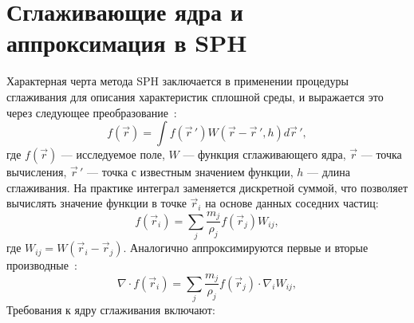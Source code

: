 \section{Сглаживающие ядра и аппроксимация в SPH}

Характерная черта метода SPH заключается в применении процедуры сглаживания для описания характеристик сплошной среды, 
и выражается это через следующее преобразование~\cite{Monaghan1988}:
%
\begin{equation}
    f(\vec{r}) = \int f(\vec{r}\,')W(\vec{r}-\vec{r}\,', h)d\vec{r}\,',
\end{equation}
%
где $f(\vec{r})$ --- исследуемое поле, 
$W$ --- функция сглаживающего ядра, 
$\vec{r}$ --- точка вычисления, 
$\vec{r}\,'$ --- точка с известным значением функции, 
$h$ --- длина сглаживания.
%
На практике интеграл заменяется дискретной суммой, 
что позволяет вычислять значение функции в точке $\vec{r}_{i}$ на основе данных соседних частиц:
%
\begin{equation}\label{eq:sph_approx}
    f(\vec{r}_{i}) = \sum\limits_{j} \frac{m_{j}}{\rho_{j}} f(\vec{r}_{j}) W_{ij},
\end{equation}
%
где $W_{ij} = W(\vec{r}_{i} - \vec{r}_{j})$.
%
Аналогично аппроксимируются первые и вторые производные~\cite{Kelager2006}:
%
\begin{equation}\label{eq:sph_deriv}
    \nabla\cdot f(\vec{r}_{i}) = \sum\limits_{j} \frac{m_{j}}{\rho_{j}} f(\vec{r}_{j}) \cdot \nabla_{i} W_{ij},
\end{equation}
%
%
Требования к ядру сглаживания включают:

